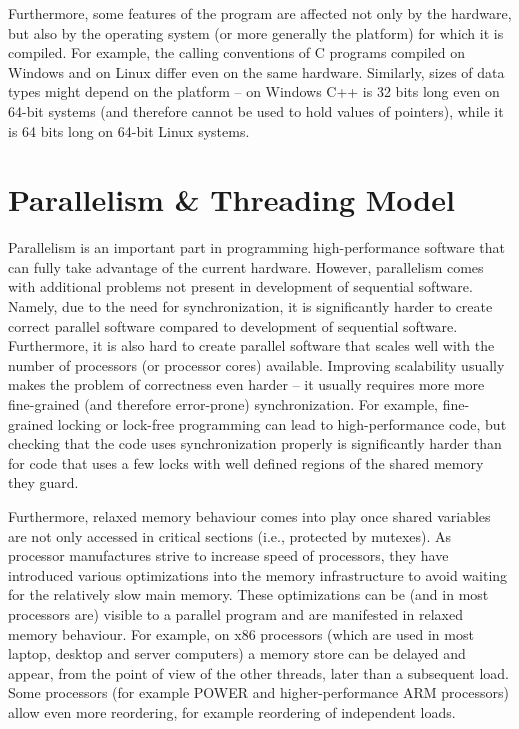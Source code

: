 Furthermore, some features of the program are affected not only by the
hardware, but also by the operating system (or more generally the platform) for
which it is compiled.
For example, the calling conventions of C programs compiled on Windows and on
Linux differ even on the same hardware.
Similarly, sizes of data types might depend on the platform -- on Windows C++  is 32 bits long even on 64-bit systems (and therefore cannot be used
to hold values of pointers), while it is 64 bits long on 64-bit Linux systems.


\section{Parallelism \& Threading Model} %

Parallelism is an important part in programming high-performance software that
can fully take advantage of the current hardware.
However, parallelism comes with additional problems not present in development
of sequential software.
Namely, due to the need for synchronization, it is significantly harder to
create correct parallel software compared to development of sequential
software.
Furthermore, it is also hard to create parallel software that scales well with
the number of processors (or processor cores) available.
Improving scalability usually makes the problem of correctness even harder --
it usually requires more more fine-grained (and therefore error-prone)
synchronization.
For example, fine-grained locking or lock-free programming can lead to
high-performance code, but checking that the code uses synchronization properly
is significantly harder than for code that uses a few locks with well defined
regions of the shared memory they guard.

Furthermore, relaxed memory behaviour comes into play once shared variables are
not only accessed in critical sections (i.e., protected by mutexes).
As processor manufactures strive to increase speed of processors, they have
introduced various optimizations into the memory infrastructure to avoid
waiting for the relatively slow main memory.
These optimizations can be (and in most processors are) visible to a parallel
program and are manifested in relaxed memory behaviour.
For example, on x86 processors (which are used in most laptop, desktop and
server computers) a memory store can be delayed and appear, from the point of
view of the other threads, later than a subsequent load.
Some processors (for example POWER and higher-performance ARM processors) allow
even more reordering, for example reordering of independent loads.

